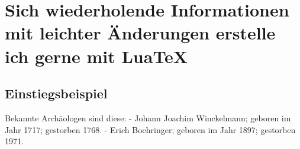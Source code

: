
\chapter{Sich wiederholende Informationen mit leichter Änderungen erstelle ich gerne mit LuaTeX}
\section{Einstiegsbeispiel}


Bekannte Archäologen sind diese:
- Johann Joachim Winckelmann; geboren im Jahr 1717; gestorben 1768.
- Erich Boehringer; geboren im Jahr 1897; gestorben 1971.


